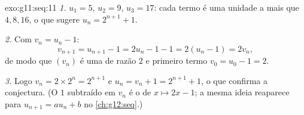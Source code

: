 \begin{solution}{exo:g11:seq:11}
\emph{1.} $u_1 = 5$, $u_2 = 9$, $u_3 = 17$: cada termo é uma unidade a
mais que $4, 8, 16$, o que sugere $u_n = 2^{n+1} + 1$.

\emph{2.} Com $v_n = u_n - 1$:
\[
v_{n+1} = u_{n+1} - 1 = 2u_n - 1 - 1 = 2(u_n - 1) = 2v_n,
\]
de modo que $(v_n)$ é uma  de razão $2$ e primeiro
termo $v_0 = u_0 - 1 = 2$.

\emph{3.} Logo $v_n = 2 \times 2^n = 2^{n+1}$ e
$u_n = v_n + 1 = 2^{n+1} + 1$, o que confirma a conjectura. (O $1$
subtraído em $v_n$ é o  de $x \mapsto 2x - 1$; a mesma ideia
reaparece para $u_{n+1} = au_n + b$ no \cref{ch:g12:seq}.)
\end{solution}

